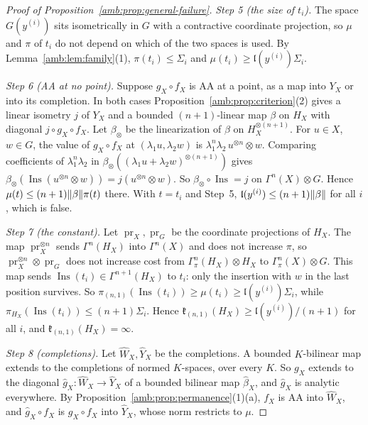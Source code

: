 \begin{proof}[Proof of Proposition~\ref{amb:prop:general-failure}]
\emph{Step 5 (the size of $t_i$).} The space $G(y^{(i)})$ sits isometrically in $G$ with a contractive coordinate projection, so $\mu$ and $\pi$ of $t_i$ do not depend on which of the two spaces is used. By Lemma~\ref{amb:lem:family}(1), $\pi(t_i)\le\Sigma_i$ and $\mu(t_i)\ge\mathfrak l(y^{(i)})\Sigma_i$.

\emph{Step 6 (AA at no point).} Suppose $g_X\circ f_X$ is AA at a point, as a map into $Y_X$ or into its completion. In both cases Proposition~\ref{amb:prop:criterion}(2) gives a linear isometry $j$ of $Y_X$ and a bounded $(n+1)$-linear map $\beta$ on $H_X$ with diagonal $j\circ g_X\circ f_X$. Let $\beta_\otimes$ be the linearization of $\beta$ on $H_X^{\otimes(n+1)}$. For $u\in X$, $w\in G$, the value of $g_X\circ f_X$ at $(\lambda_1u,\lambda_2w)$ is $\lambda_1^n\lambda_2\,u^{\otimes n}\otimes w$. Comparing coefficients of $\lambda_1^n\lambda_2$ in $\beta_\otimes((\lambda_1u+\lambda_2w)^{\otimes(n+1)})$ gives $\beta_\otimes(\operatorname{Ins}(u^{\otimes n}\otimes w))=j(u^{\otimes n}\otimes w)$. So $\beta_\otimes\circ\operatorname{Ins}=j$ on $\Gamma^n(X)\otimes G$. Hence $\mu(t)\le(n+1)\lVert \beta\rVert\pi(t)$ there. With $t=t_i$ and Step~5, $\mathfrak l(y^{(i)})\le(n+1)\lVert \beta\rVert$ for all $i$, which is false.

\emph{Step 7 (the constant).} Let $\operatorname{pr}_X,\operatorname{pr}_G$ be the coordinate projections of $H_X$. The map $\operatorname{pr}_X^{\otimes n}$ sends $\Gamma^n(H_X)$ into $\Gamma^n(X)$ and does not increase $\pi$, so $\operatorname{pr}_X^{\otimes n}\otimes\operatorname{pr}_G$ does not increase cost from $\Gamma^n_\pi(H_X)\otimes H_X$ to $\Gamma^n_\pi(X)\otimes G$. This map sends $\operatorname{Ins}(t_i)\in\Gamma^{n+1}(H_X)$ to $t_i$: only the insertion with $w$ in the last position survives. So $\pi_{(n,1)}(\operatorname{Ins}(t_i))\ge\mu(t_i)\ge\mathfrak l(y^{(i)})\Sigma_i$, while $\pi_{H_X}(\operatorname{Ins}(t_i))\le(n+1)\Sigma_i$. Hence $\mathfrak k_{(n,1)}(H_X)\ge\mathfrak l(y^{(i)})/(n+1)$ for all $i$, and $\mathfrak k_{(n,1)}(H_X)=\infty$.

\emph{Step 8 (completions).} Let $\widehat W_X,\widehat Y_X$ be the completions. A bounded $K$\nobreakdash-bilinear map extends to the completions of normed $K$\nobreakdash-spaces, over every $K$. So $g_X$ extends to the diagonal $\hat g_X\colon\widehat W_X\to\widehat Y_X$ of a bounded bilinear map $\hat\beta_X$, and $\hat g_X$ is analytic everywhere. By Proposition~\ref{amb:prop:permanence}(1)(a), $f_X$ is AA into $\widehat W_X$, and $\hat g_X\circ f_X$ is $g_X\circ f_X$ into $\widehat Y_X$, whose norm restricts to $\mu$.
\end{proof}

